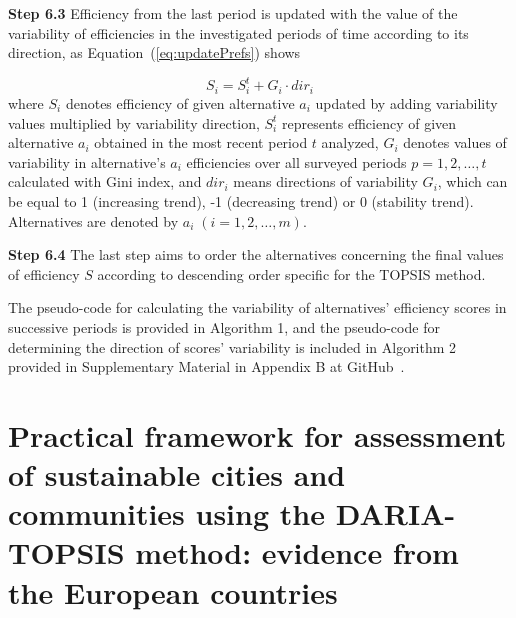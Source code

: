 \documentclass[final,5p,times,twocolumn,authoryear]{elsarticle}
\begin{document}
\textbf{Step 6.3} Efficiency from the last period is updated with the value of the variability of efficiencies in the investigated periods of time according to its direction, as Equation~(\ref{eq:updatePrefs}) shows

\begin{equation}
    S_{i} = S_{i}^{t} + G_{i} \cdot dir_{i}
    \label{eq:updatePrefs}
\end{equation}
%
where $S_{i}$ denotes efficiency of given alternative $a_{i}$ updated by adding variability values multiplied by variability direction, $S_{i}^{t}$ represents efficiency of given alternative $a_{i}$ obtained in the most recent period $t$ analyzed, $G_{i}$ denotes values of variability in alternative's $a_{i}$ efficiencies over all surveyed periods $p = 1, 2, \ldots, t$ calculated with Gini index, and $dir_{i}$ means directions of variability $G_{i}$, which can be equal to 1 (increasing trend), -1 (decreasing trend) or 0 (stability trend). Alternatives are denoted by $a_{i} \; (i = 1, 2, \ldots, m)$.

\textbf{Step 6.4} The last step aims to order the alternatives concerning the final values of efficiency $S$ according to descending order specific for the TOPSIS method.

The pseudo-code for calculating the variability of alternatives' efficiency scores in successive periods is provided in Algorithm 1, and the pseudo-code for determining the direction of scores' variability is included in Algorithm 2 provided in Supplementary Material in Appendix B at GitHub~\citep{dariagithub2022}.

\section{Practical framework for assessment of sustainable cities and communities using the DARIA-TOPSIS method: evidence from the European countries}
\label{sec:frameworkCaseStudy}
\end{document}
